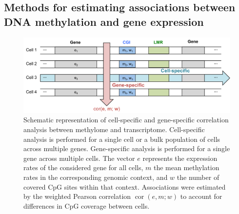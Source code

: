 \subsection{Methods for estimating associations between DNA methylation and gene expression} \label{sec:mt_method}

\newcommand{\Xcov}{\operatorname{cov}}
\newcommand{\Xcor}{\operatorname{cor}}

\begin{figure}[htbp!]
\centering
\includegraphics[width=1.0\textwidth]{method}
\caption[Schematic representation of cell-specific and gene-specific correlation analysis between methylome and transcriptome.]{Schematic representation of cell-specific and gene-specific correlation analysis between methylome and transcriptome. Cell-specific analysis is performed for a single cell or a bulk population of cells across multiple genes. Gene-specific analysis is performed for a single gene across multiple cells. The vector $e$ represents the expression rates of the considered gene for all cells, $m$ the mean methylation rates in the corresponding genomic context, and $w$ the number of covered CpG sites within that context. Associations were estimated by the weighted Pearson correlation $\Xcor(e, m; w)$ to account for differences in CpG coverage between cells.}
\label{fig:mt_method}
\end{figure}

